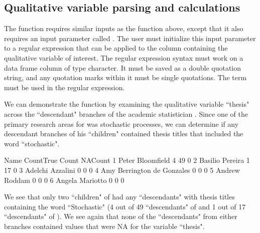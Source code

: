 \documentclass[article,shortnames]{jss}
\begin{document}
\clearpage
\subsection{Qualitative variable parsing and calculations}

The  function requires similar inputs as the  function above, except that it also requires an input parameter called . The user must initialize this input parameter to a regular expression that can be applied to the column containing the qualitative variable of interest. The regular expression syntax must work on a data frame column of type character. It must be saved as a double quotation string, and any quotation marks within it must be single quotations. The term  must be used in the regular expression.

We can demonstrate the  function by examining the qualitative variable ``thesis" across the ``descendant" branches of the academic statistician . Since one of the primary research areas for  was stochastic processes, we can determine if any descendant branches of his ``children" contained thesis titles that included the word ``stochastic".

\begin{CodeChunk}
\begin{CodeOutput}
                        Name CountTrue Count NACount
1           Peter Bloomfield         4    49       0
2            Basilio Pereira         1    17       0
3           Adelchi Azzalini         0     0       0
4 Amy Berrington de Gonzales         0     0       0
5              Andrew Roddam         0     0       0
6            Angela Mariotto         0     0       0
\end{CodeOutput}
\end{CodeChunk}

We see that only two ``children" of  had any ``descendants" with thesis titles containing the word ``Stochastic" (4 out of 49 ``descendants" of  and 1 out of 17 ``descendants" of ). We see again that none of the ``descendants" from either branches contained values that were NA for the variable ``thesis".
\end{document}
